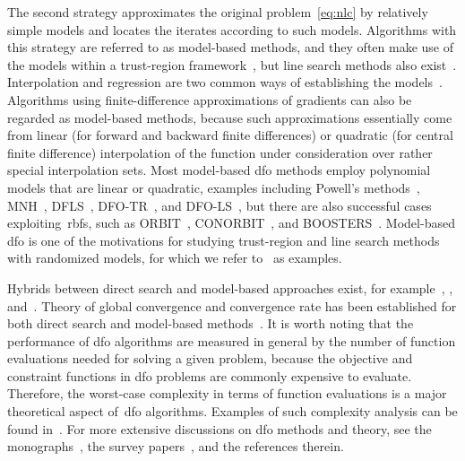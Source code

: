 \documentclass[11pt,draft]{article}
\numberwithin{equation}{section}
\def\boosters{\mbox{BOOSTERS}}
\def\conorbit{\mbox{CONORBIT}}
\def\dfls{\mbox{DFLS}}
\def\dfols{\mbox{DFO-LS}}
\def\dfotr{\mbox{DFO-TR}}
\def\mnh{\mbox{MNH}}
\def\orbit{\mbox{ORBIT}}
\begin{document}
The second strategy approximates the original problem~\cref{eq:nlc} by relatively simple models and locates the iterates according to such models.
Algorithms with this strategy are referred to as model-based methods, and they often make use of the
models within a trust-region framework~\cite{Conn_Gould_Toint_2000,Conn_Scheinberg_Vicente_2009a,Yuan_2015}, but line search methods also exist~\cite{Berahas_Byrd_Nocedal_2019,Shi_Etal_2021}.
Interpolation and regression are two common ways of establishing the models~\cite{Powell_2001,Powell_2004a,Conn_Scheinberg_Vicente_2008a,Conn_Scheinberg_Vicente_2008a,Wild_Regis_Shoemaker_2008,Bandeira_Scheinberg_Vicente_2012,Billups_Larson_Graf_2013,Regis_Wild_2017}.
Algorithms using finite-difference approximations of gradients can also be regarded as model-based methods, because such approximations essentially come from linear (for forward and backward finite differences) or quadratic (for central finite difference) interpolation of the function under consideration over rather special interpolation sets.
Most model-based \gls{dfo} methods employ polynomial models that are linear or quadratic, examples including
Powell's methods~\cite{Powell_1994,Powell_2002,Powell_2006,Powell_2009}, \mnh~\cite{Wild_2008}, \dfls~\cite{Zhang_Conn_Scheinberg_2010}, \dfotr~\cite{Bandeira_Scheinberg_Vicente_2012}, and \dfols~\cite{Cartis_Etal_2019}, but there are also successful cases exploiting~\glspl{rbf},
such as \orbit~\cite{Wild_Regis_Shoemaker_2008}, \conorbit~\cite{Regis_Wild_2017}, and \boosters~\cite{Oeuvray_Bierlaire_2009}.
Model-based \gls{dfo} is one of the motivations for studying trust-region and line search methods with
randomized models, for which we refer to~\cite{Bandeira_Scheinberg_Vicente_2014,Gratton_Etal_2018,Cartis_Scheinberg_2018} as examples.

Hybrids between direct search and model-based approaches exist, for example~\cite{Custodio_Vicente_2007}, \cite[Algorithm~4.7]{Kelley_2011}, and~\cite{Conn_Digabel_2013}.
Theory of global convergence and convergence rate has been established for both direct search and model-based methods~\cite{Torczon_1997,Conn_Scheinberg_Toint_1997a,Kolda_Lewis_Torczon_2003,Conn_Scheinberg_Vicente_2009a,Powell_2012,Vicente_2013,Dodangeh_Vicente_2016,Garmanjani_Judice_Vicente_2016,Gratton_Royer_Vicente_2020}.
It is worth noting that the performance of \gls{dfo} algorithms are measured in general by the number of function evaluations needed for solving a given problem, because the objective and constraint functions in \gls{dfo} problems are commonly expensive to evaluate.
Therefore, the worst-case complexity in terms of function evaluations is a major theoretical aspect of~\gls{dfo} algorithms.
Examples of such complexity analysis can be found in~\cite{Vicente_2013,Gratton_Etal_2015,Dodangeh_Vicente_2016,Dodangeh_Vicente_Zhang_2016}.
For more extensive discussions on \gls{dfo} methods and theory, see the monographs~\cite{Conn_Scheinberg_Vicente_2009b,Audet_Hare_2017}, the survey papers~\cite{Rios_Sahinidis_2013,Custodio_Scheinberg_Vicente_2017,Larson_Menickelly_Wild_2019}, and the references therein.
\end{document}
